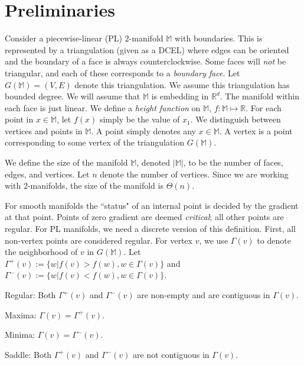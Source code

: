 \documentclass[11pt]{article}
\theoremstyle{definition}
\newcommand{\innbd}{\Gamma^-}
\newcommand{\nbd}{\Gamma}
\newcommand{\outnbd}{\Gamma^+}
\newcommand{\MM}{\mathbb{M}}
\newcommand{\RR}{\mathbb{R}}
\begin{document}
\section{Preliminaries}
Consider a piecewise-linear (PL) $2$-manifold $\MM$ with boundaries.
This is represented by a triangulation (given as a DCEL) where edges
can be oriented and the boundary of a face is always counterclockwise. Some faces will \emph{not}
be triangular, and each of these corresponds to a \emph{boundary face}.
Let $G(\MM) = (V,E)$ denote this triangulation. We assume this triangulation
has bounded degree.
We will assume that $\MM$ is embedding in $\RR^d$.
The manifold within each face is just linear.
We define a \emph{height function} on $\MM$, $f:\MM \mapsto \RR$. For each point in $x \in \MM$, let $f(x)$ simply be the value of $x_1$.
We distinguish between vertices and points in $\MM$. A point simply denotes any $x \in \MM$. A vertex is a point
corresponding to some vertex of the triangulation $G(\MM)$.

We define the size of the manifold $\MM$, denoted $|\MM|$, to be the number of faces, edges, and vertices.  
Let $n$ denote the number of vertices.  
Since we are working with $2$-manifolds, the size of the manifold is $\Theta(n)$.

For smooth manifolds the ``status" of an internal point is decided by the gradient at that point. 
Points of zero gradient are deemed \emph{critical};
all other points are regular.
For PL manifolds, we need a discrete version of this definition.
First, all non-vertex points are considered regular.
For vertex $v$, we use $\nbd(v)$ to denote the neighborhood of $v$ in $G(\MM)$. Let $\outnbd(v) := \{ w | f(v) > f(w), w \in \Gamma(v)\}$
and $\innbd(v) := \{w | f(v) < f(w), w \in \Gamma(v)\}$. 
\smallskip
\begin{asparaenum}
	\item Regular: Both $\outnbd(v)$ and $\innbd(v)$ are non-empty and are contiguous in $\nbd(v)$.
	\item Maxima: $\nbd(v) = \outnbd(v)$.
	\item Minima: $\nbd(v) = \innbd(v)$.
	\item Saddle: Both $\outnbd(v)$ and $\innbd(v)$ are not contiguous in $\nbd(v)$.
\end{asparaenum}
\smallskip
\end{document}
